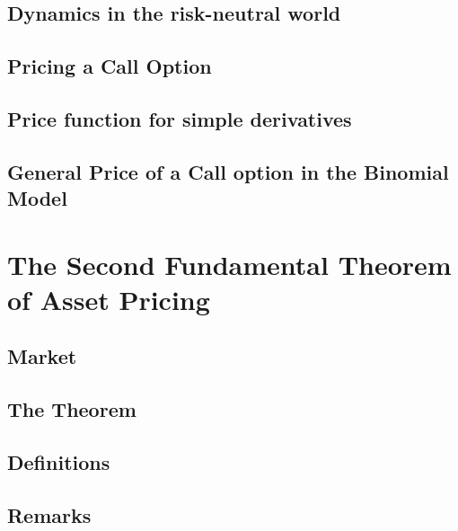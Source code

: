 \documentclass{beamer}
\begin{document}
\subsection{Dynamics in the risk-neutral world}
\subsection{Pricing a Call Option}
\subsection{Price function for simple derivatives}
\subsection{General Price of a Call option in the Binomial Model}

\section{The Second Fundamental Theorem of Asset Pricing}
\subsection{Market}
\subsection{The Theorem}
\subsection{Definitions}
\subsection{Remarks}
\end{document}
